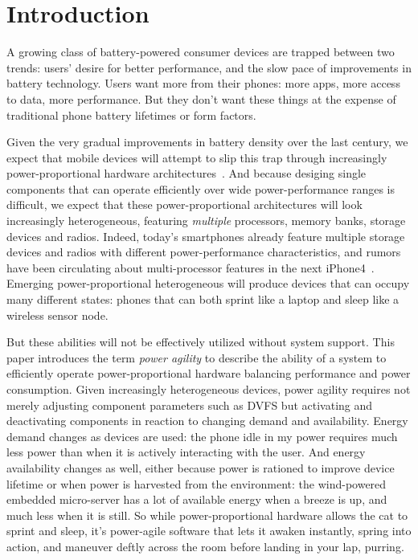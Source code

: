 \section{Introduction}

A growing class of battery-powered consumer devices are trapped between two
trends: users' desire for better performance, and the slow pace of
improvements in battery technology. Users want more from their phones: more
apps, more access to data, more performance. But they don't want these things
at the expense of traditional phone battery lifetimes or form factors.

Given the very gradual improvements in battery density over the last century,
we expect that mobile devices will attempt to slip this trap through
increasingly power-proportional hardware
architectures~\cite{barroso-energyproportional}. And because desiging single
components that can operate efficiently over wide power-performance ranges is
difficult, we expect that these power-proportional architectures will look
increasingly heterogeneous, featuring \textit{multiple} processors, memory
banks, storage devices and radios. Indeed, today's smartphones already
feature multiple storage devices and radios with different power-performance
characteristics, and rumors have been circulating about multi-processor
features in the next iPhone4~\cite{iphone4-multicore}. Emerging
power-proportional heterogeneous will produce devices that can occupy many
different states: phones that can both sprint like a laptop and sleep like a
wireless sensor node.

But these abilities will not be effectively utilized without system support.
This paper introduces the term \textit{power agility} to describe the ability
of a system to efficiently operate power-proportional hardware balancing
performance and power consumption. Given increasingly heterogeneous devices,
power agility requires not merely adjusting component parameters such as DVFS
but activating and deactivating components in reaction to changing demand and
availability. Energy demand changes as devices are used: the phone idle in my
power requires much less power than when it is actively interacting with the
user. And energy availability changes as well, either because power is
rationed to improve device lifetime or when power is harvested from the
environment: the wind-powered embedded micro-server has a lot of available
energy when a breeze is up, and much less when it is still. So while
power-proportional hardware allows the cat to sprint and sleep, it's
power-agile software that lets it awaken instantly, spring into action, and
maneuver deftly across the room before landing in your lap, purring.


